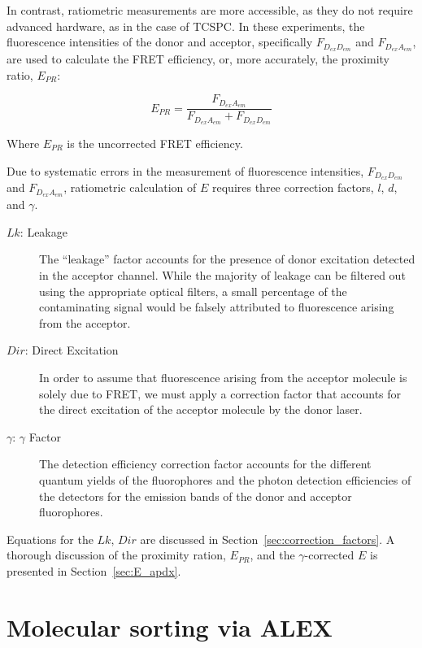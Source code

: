 In contrast, ratiometric measurements are more accessible, as they do not require advanced hardware, as in the case of \ac{TCSPC}. 
In these experiments, the fluorescence intensities of the donor and acceptor, specifically $F_{D_{ex}D_{em}}$ and $F_{D_{ex}A_{em}}$, are used to calculate the FRET efficiency, or, more accurately, the proximity ratio, $E_{PR}$:

\begin{equation}
    \label{eqn: E_ratiometric}
    E_{PR}=\frac{F_{D_{ex}A_{em}}}{F_{D_{ex}A_{em}}+F_{D_{ex}D_{em}}}
\end{equation}

\noindent
Where $E_{PR}$ is the uncorrected FRET efficiency.

Due to systematic errors in the measurement of fluorescence intensities, $F_{D_{ex}D_{em}}$ and $F_{D_{ex}A_{em}}$, ratiometric calculation of $E$ requires three correction factors, $l$, $d$, and $\gamma$.

\begin{description}
    \item[$Lk$: Leakage] The \enquote{leakage} factor accounts for the presence of donor excitation detected in the acceptor channel.
    While the majority of leakage can be filtered out using the appropriate optical filters, a small percentage of the contaminating signal would be falsely attributed to fluorescence arising from the acceptor. 
    \item[$Dir$: Direct Excitation] In order to assume that fluorescence arising from the acceptor molecule is solely due to FRET, we must apply a correction factor that accounts for the direct excitation of the acceptor molecule by the donor laser.
    \item[$\gamma$: $\gamma$ Factor] The detection efficiency correction factor accounts for the different quantum yields of the fluorophores and the photon detection efficiencies of the detectors for the emission bands of the donor and acceptor fluorophores.
\end{description}

Equations for the $Lk$, $Dir$ are discussed in Section~\ref{sec:correction_factors}. 
A thorough discussion of the proximity ration, $E_{PR}$, and the $\gamma$-corrected $E$ is presented in Section~\ref{sec:E_apdx}.

\newpage

\section{Molecular sorting via ALEX}
\label{sec:ALEX_intro}

